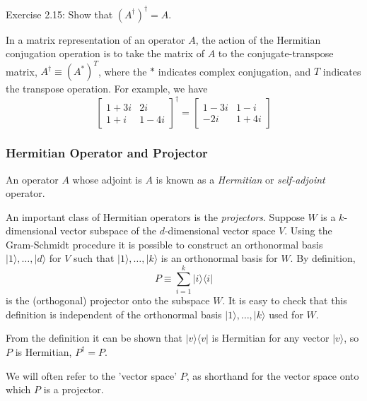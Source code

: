 \begin{exercise}
Exercise 2.15: Show that $\left(A^{\dagger}\right)^{\dagger}=A$.
\end{exercise}

In a matrix representation of an operator $A$, the action of the Hermitian conjugation operation is to take the matrix of $A$ to the conjugate-transpose matrix, $A^{\dagger} \equiv\left(A^{*}\right)^{T}$, where the $*$ indicates complex conjugation, and $T$ indicates the transpose operation. For example, we have
\begin{equation}
    \left[\begin{array}{cc}
1+3 i & 2 i \\
1+i & 1-4 i
\end{array}\right]^{\dagger}=\left[\begin{array}{cc}
1-3 i & 1-i \\
-2 i & 1+4 i
\end{array}\right]
\end{equation}

\subsubsection{Hermitian Operator and Projector}

An operator $A$ whose adjoint is $A$ is known as a \textit{Hermitian} or \textit{self-adjoint} operator. 

An important class of Hermitian operators is the \textit{projectors}. Suppose $W$ is a $k$-dimensional vector subspace of the $d$-dimensional vector space $V$. Using the Gram-Schmidt procedure it is possible to construct an orthonormal basis $|1\rangle, \ldots,|d\rangle$ for $V$ such that $|1\rangle, \ldots,|k\rangle$ is an orthonormal basis for $W$. By definition,
\begin{equation}
    P \equiv \sum_{i=1}^{k}|i\rangle\langle i|
\end{equation}
is the (orthogonal) projector onto the subspace $W$. It is easy to check that this definition is independent of the orthonormal basis $|1\rangle, \ldots,|k\rangle$ used for $W$. 

From the definition it can be shown that $|v\rangle\langle v|$ is Hermitian for any vector $|v\rangle$, so $P$ is Hermitian, $P^{\dagger}=P$. 

\begin{remark} %
    We will often refer to the 'vector space' $P$, as shorthand for the vector space onto which $P$ is a projector. 
\end{remark}

